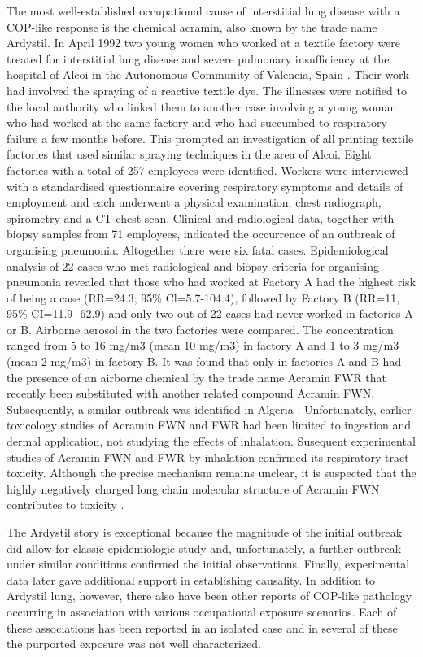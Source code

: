 \documentclass[a4
er,12pt]{article}
\begin{document}
The most well-established occupational cause of interstitial lung disease with a COP-like response is the chemical acramin, also known by the trade name Ardystil. In April 1992 two young women who worked at a textile factory were treated for interstitial lung disease and severe pulmonary insufficiency at the hospital of Alcoi in the Autonomous Community of Valencia, Spain \cite{Moya1994}. Their work had involved the spraying of a reactive textile dye. The illnesses were notified to the local authority who linked them to another case involving a young woman who had worked at the same factory and who had succumbed to respiratory failure a few months before. This prompted an investigation of all printing textile factories that used similar spraying techniques in the area of Alcoi. Eight factories with a total of 257 employees were identified. Workers were interviewed with a standardised questionnaire covering respiratory symptoms and details of employment and each underwent a physical examination, chest radiograph, spirometry and a CT chest scan. Clinical and radiological data, together with biopsy samples from 71 employees, indicated the occurrence of an outbreak of organising pneumonia. Altogether there were six fatal cases. Epidemiological analysis of 22 cases who met radiological and biopsy criteria for organising pneumonia revealed that those who had worked at Factory A had the highest risk of being a case (RR=24.3; 95\% Cl=5.7-104.4), followed by Factory B (RR=11, 95\% CI=11.9- 62.9) and only two out of 22 cases had never worked in factories A or B. Airborne aerosol in the two factories were compared. The concentration ranged from 5 to 16 mg/m3 (mean 10 mg/m3) in factory A and 1 to 3 mg/m3 (mean 2 mg/m3) in factory B. It was found that only in factories A and B had the presence of an airborne chemical by the trade name Acramin FWR that recently been substituted with another related compound Acramin FWN. Subsequently, a similar outbreak was identified in Algeria \cite{OuldKadi1994}. Unfortunately, earlier toxicology studies of Acramin FWN and FWR had been limited to ingestion and dermal application, not studying the effects of inhalation. Susequent experimental studies of Acramin FWN and FWR by inhalation confirmed its respiratory tract toxicity. Although the precise mechanism remains unclear, it is suspected that the highly negatively charged long chain molecular structure of Acramin FWN contributes to toxicity \cite{Hoet1999}.

The Ardystil story is exceptional because the magnitude of the initial outbreak did allow for classic epidemiologic study and, unfortunately, a further outbreak under similar conditions confirmed the initial observations. Finally, experimental data later gave additional support in establishing causality. In addition to Ardystil lung, however, there also have been other reports of COP-like pathology occurring in association with various occupational exposure scenarios. Each of these associations has been reported in an isolated case and in several of these the purported exposure was not well characterized.
\end{document}
